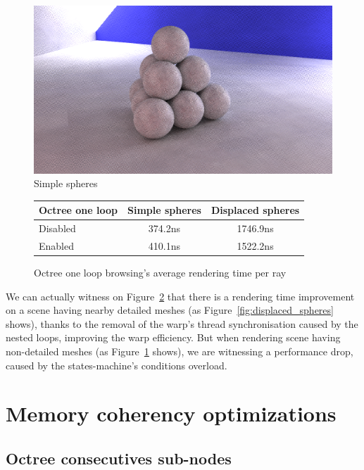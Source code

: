 \documentclass[10pt,twocolumn,a4paper]{article}
\begin{document}
\begin{figure}[h]
    \centering
    \includegraphics[width=0.8\columnwidth]{render_spheres.png}
    \caption{Simple spheres}
    \label{fig:spheres}
\end{figure}

\begin{figure}[H]
    \tiny
    \centering
    \begin{tabular}{ | l | c | c | }

        \hline
        Octree one loop & Simple spheres & Displaced spheres \\
        \hline
        Disabled & 374.2ns & 1746.9ns \\
        Enabled & 410.1ns & 1522.2ns \\
        \hline

    \end{tabular}
    \caption{Octree one loop browsing's average rendering time per ray}
    \label{table:octree_one_loop_browsing}
\end{figure}

We can actually witness on Figure~\ref{table:octree_one_loop_browsing} that
there is a rendering time improvement on a scene having nearby detailed meshes
(as Figure~\ref{fig:displaced_spheres} shows), thanks to the removal of the warp's thread
synchronisation caused by the nested loops, improving the warp efficiency. But
when rendering scene having non-detailed meshes (as Figure~\ref{fig:spheres} shows), we
are witnessing a performance drop, caused by the states-machine's conditions
overload.


\section{Memory coherency optimizations}
\subsection{Octree consecutives sub-nodes}
\end{document}
